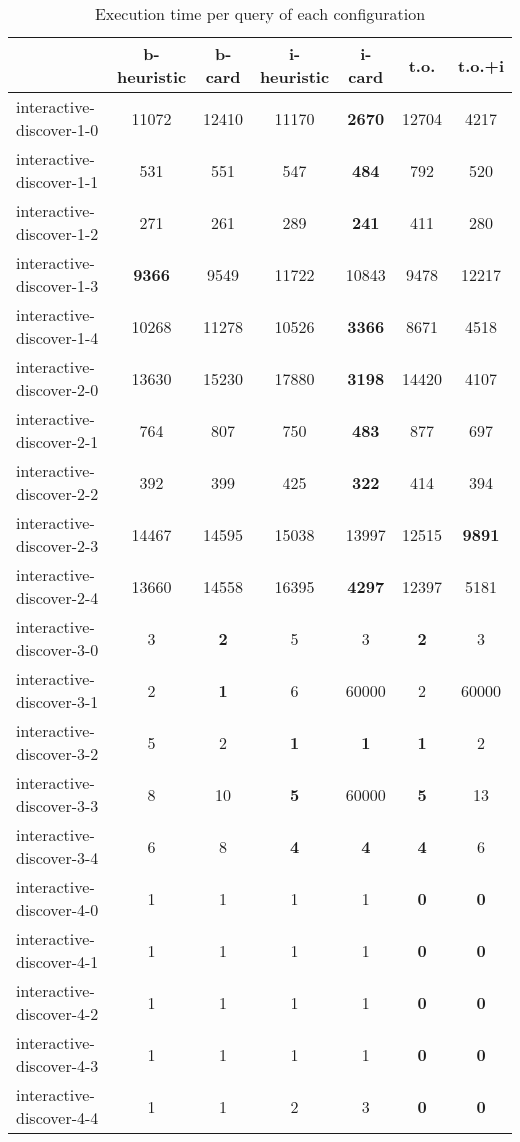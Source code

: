 \documentclass[preview]{standalone}
\begin{document}
 
\begin{table}[!ht] %
\caption{Execution time per query of each configuration} 
\centering 
\begin{tabular}{lcccccc} 
& b-heuristic & b-card & i-heuristic & i-card & t.o. & t.o.+i \\ \hline 
interactive-discover-1-0 & 11072 & 12410 & 11170 & \textbf{2670} & 12704 & 4217 \\ 
 interactive-discover-1-1 & 531 & 551 & 547 & \textbf{484} & 792 & 520 \\ 
 interactive-discover-1-2 & 271 & 261 & 289 & \textbf{241} & 411 & 280 \\ 
 interactive-discover-1-3 & \textbf{9366} & 9549 & 11722 & 10843 & 9478 & 12217 \\ 
 interactive-discover-1-4 & 10268 & 11278 & 10526 & \textbf{3366} & 8671 & 4518 \\ 
 interactive-discover-2-0 & 13630 & 15230 & 17880 & \textbf{3198} & 14420 & 4107 \\ 
 interactive-discover-2-1 & 764 & 807 & 750 & \textbf{483} & 877 & 697 \\ 
 interactive-discover-2-2 & 392 & 399 & 425 & \textbf{322} & 414 & 394 \\ 
 interactive-discover-2-3 & 14467 & 14595 & 15038 & 13997 & 12515 & \textbf{9891} \\ 
 interactive-discover-2-4 & 13660 & 14558 & 16395 & \textbf{4297} & 12397 & 5181 \\ 
 interactive-discover-3-0 & 3 & \textbf{2} & 5 & 3 & \textbf{2} & 3 \\ 
 interactive-discover-3-1 & 2 & \textbf{1} & 6 & 60000 & 2 & 60000 \\ 
 interactive-discover-3-2 & 5 & 2 & \textbf{1} & \textbf{1} & \textbf{1} & 2 \\ 
 interactive-discover-3-3 & 8 & 10 & \textbf{5} & 60000 & \textbf{5} & 13 \\ 
 interactive-discover-3-4 & 6 & 8 & \textbf{4} & \textbf{4} & \textbf{4} & 6 \\ 
 interactive-discover-4-0 & 1 & 1 & 1 & 1 & \textbf{0} & \textbf{0} \\ 
 interactive-discover-4-1 & 1 & 1 & 1 & 1 & \textbf{0} & \textbf{0} \\ 
 interactive-discover-4-2 & 1 & 1 & 1 & 1 & \textbf{0} & \textbf{0} \\ 
 interactive-discover-4-3 & 1 & 1 & 1 & 1 & \textbf{0} & \textbf{0} \\ 
 interactive-discover-4-4 & 1 & 1 & 2 & 3 & \textbf{0} & \textbf{0} \\ 

\end{tabular}
\end{table}
\end{document}
